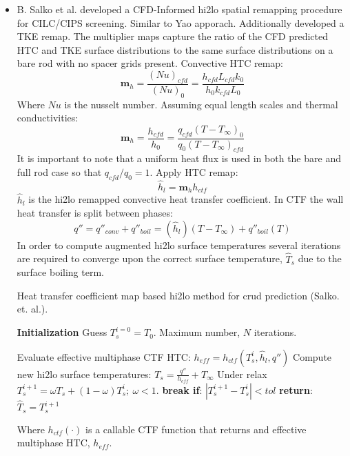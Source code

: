 \begin{itemize}
    \item  B. Salko et al. developed a CFD-Informed hi2lo spatial remapping procedure for CILC/CIPS screening. \cite{salko17}
    Similar to Yao apporach.  Additionally developed a TKE remap.
    The multiplier maps capture the ratio of the CFD predicted HTC and TKE surface distributions to the same surface distributions on a bare rod with no spacer grids present.
    Convective HTC remap:
    \begin{equation}
        \mathbf m_h = \frac{(Nu)_{cfd}}{(Nu)_{0}} = \frac{h_{cfd} L_{cfd} k_{0} }{h_{0}k_{cfd} L_{0}}
    \end{equation}
    Where $Nu$ is the nusselt number.  Assuming equal length scales and thermal conductivities:
    \begin{equation}
        \mathbf m_h = \frac{h_{cfd}}{h_{0}} = \frac{q_{cfd}(T-T_\infty)_{0}}{q_{0}(T-T_\infty)_{cfd}}
    \end{equation}
    It is important to note that a uniform heat flux is used in both the bare and full rod case so that $q_{cfd}/q_0 =1 $.
    Apply HTC remap:
    \begin{equation}
        \hat h_{l} = \mathbf m_h h_{ctf}
    \end{equation}
    $\hat h_l$ is the hi2lo remapped convective heat transfer coefficient.  In CTF the wall heat transfer is split between phases:
    \begin{equation}
        q'' = q''_{conv} + q''_{boil} = (\hat h_l)(T-T_{\infty}) + q''_{boil}(T)
    \end{equation}
    In order to compute augmented hi2lo surface temperatures
    several iterations are required to converge upon the correct surface temperature, $\hat T_s$ due to the surface boiling term.

    \begin{algorithm}[H]
        \caption{Heat transfer coefficient map based hi2lo method for crud prediction (Salko. et. al.).}
    \begin{algorithmic}
    \STATE \textbf{Initialization} 
    \STATE Guess $T^{i=0}_s=T_0$.  Maximum number, $N$ iterations.

           \STATE Evaluate effective multiphase CTF HTC: $h_{eff} = h_{{ctf}}(T^i_{s}, \hat h_l, q'')$ \;
           \STATE Compute new hi2lo surface temperatures: $T_{s} = \frac{q''}{h_{eff}} + T_\infty$ \;
           \STATE  Under relax  $T^{i+1}_{s} = \omega T_{s} + (1 - \omega) T^{i}_{s} ;\ \omega < 1.$ \;
           \STATE  \textbf{break if}:  $|T^{i+1}_s - T^i_s| < tol$ \;
        \ENDFOR 
    \STATE \textbf{return}: $\hat T_s = T^{i+1}_s$
    \end{algorithmic}
    \end{algorithm}
    Where $h_{ctf}(\cdot)$ is a callable CTF function that returns and effective multiphase HTC, $h_{eff}$.


\end{itemize}
